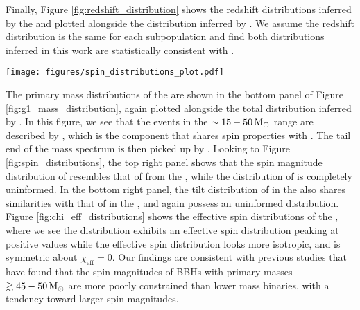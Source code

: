 Finally, Figure \ref{fig:redshift_distribution} shows the redshift distributions inferred by the \base{} and \comp{} plotted alongside the distribution inferred by \brucepaper. We assume the redshift distribution is the same for each subpopulation and find both distributions inferred in this work are statistically consistent with \brucepaper.

\begin{figure*}[]
    \begin{centering}
        \texttt{[image: figures/spin\_distributions\_plot.pdf]}
        \caption{The spin magnitude and tilt distributions inferred by the \base{} (top left and bottom left) and the \comp{} (top right and bottom right). In each panel, the medians of the subpopulation component distributions are shown in dashed lines and the shaded regions indicate the $90\%$ credible regions. The dashed gray lines show the $90\%$ credible bounds of the B-Spline models' prior predictive distributions. The subpopulation distributions are not weighted by their respective branching ratios.}
        \label{fig:spin_distributions}
    \end{centering}
\end{figure*}

The primary mass distributions of the \comp{} are shown in the bottom panel of Figure \ref{fig:g1_mass_distribution}, again plotted alongside the total distribution inferred by \brucepaper{}. In this figure, we see that the events in the $\sim15-50 {\,\rm M}_\odot$ range are described by \contA{}, which is the component that shares spin properties with \first{}. The tail end of the mass spectrum is then picked up by \popB{}. Looking to Figure \ref{fig:spin_distributions}, the top right panel shows that the spin magnitude distribution of \popA{} resembles that of \popA{} from the \base{}, while the distribution of \popB{} is completely uninformed. In the bottom right panel, the tilt distribution of \popA{} in the \comp{} also shares similarities with that of \popA{} in the \base{}, and again \popB{} possess an uninformed distribution. Figure \ref{fig:chi_eff_distributions} shows the effective spin distributions of the \comp{}, where we see the \popA{} distribution exhibits an effective spin distribution peaking at positive values while the \popB{} effective spin distribution looks more isotropic, and is symmetric about $\chi_\mathrm{eff} = 0$. Our findings are consistent with previous studies \citep{2111.03634,2110.13542} that have found that the spin magnitudes of BBHs with primary masses $\gtrsim 45-50 {\,\rm M}_\odot$ are more poorly constrained than lower mass binaries, with a tendency toward larger spin magnitudes.


